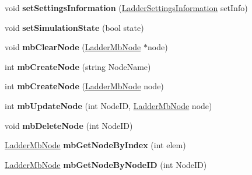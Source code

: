 \begin{DoxyCompactItemize}
\item 
\hypertarget{class_ladder_diagram_a2f459d6f5f65b1c18a575e7ed6eaf181}{void {\bfseries set\-Settings\-Information} (\hyperlink{struct_ladder_settings_information}{Ladder\-Settings\-Information} set\-Info)}\label{class_ladder_diagram_a2f459d6f5f65b1c18a575e7ed6eaf181}

\item 
\hypertarget{class_ladder_diagram_ac840af55a74732e3f97f3cfafa905f01}{void {\bfseries set\-Simulation\-State} (bool state)}\label{class_ladder_diagram_ac840af55a74732e3f97f3cfafa905f01}

\item 
\hypertarget{class_ladder_diagram_a9e08c0739d3c4e00cd5d76350e98efec}{void {\bfseries mb\-Clear\-Node} (\hyperlink{struct_ladder_mb_node}{Ladder\-Mb\-Node} $\ast$node)}\label{class_ladder_diagram_a9e08c0739d3c4e00cd5d76350e98efec}

\item 
\hypertarget{class_ladder_diagram_a8c61b8b2d7f5a47adc4b2a25e6cee8ae}{int {\bfseries mb\-Create\-Node} (string Node\-Name)}\label{class_ladder_diagram_a8c61b8b2d7f5a47adc4b2a25e6cee8ae}

\item 
\hypertarget{class_ladder_diagram_a1e11dcee65331fd235aa32b53c257ca6}{int {\bfseries mb\-Create\-Node} (\hyperlink{struct_ladder_mb_node}{Ladder\-Mb\-Node} node)}\label{class_ladder_diagram_a1e11dcee65331fd235aa32b53c257ca6}

\item 
\hypertarget{class_ladder_diagram_a61e611ad299f41c564d7b4bbe547246f}{int {\bfseries mb\-Update\-Node} (int Node\-I\-D, \hyperlink{struct_ladder_mb_node}{Ladder\-Mb\-Node} node)}\label{class_ladder_diagram_a61e611ad299f41c564d7b4bbe547246f}

\item 
\hypertarget{class_ladder_diagram_a3ab001ee5e7c12e90e0049ec241dbbbf}{void {\bfseries mb\-Delete\-Node} (int Node\-I\-D)}\label{class_ladder_diagram_a3ab001ee5e7c12e90e0049ec241dbbbf}

\item 
\hypertarget{class_ladder_diagram_a025422c9b103df4c389a1549f1af1fe6}{\hyperlink{struct_ladder_mb_node}{Ladder\-Mb\-Node} {\bfseries mb\-Get\-Node\-By\-Index} (int elem)}\label{class_ladder_diagram_a025422c9b103df4c389a1549f1af1fe6}

\item 
\hypertarget{class_ladder_diagram_a5efb7aadbeb714731c6b1cb3c3c1c481}{\hyperlink{struct_ladder_mb_node}{Ladder\-Mb\-Node} {\bfseries mb\-Get\-Node\-By\-Node\-I\-D} (int Node\-I\-D)}\label{class_ladder_diagram_a5efb7aadbeb714731c6b1cb3c3c1c481}


\end{DoxyCompactItemize}
